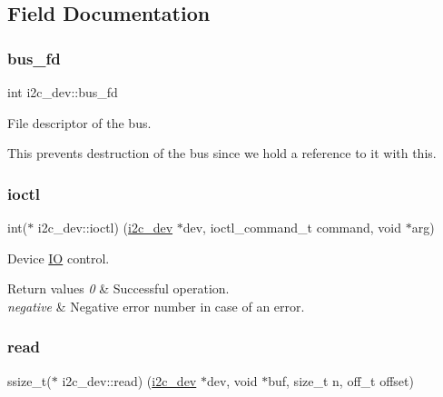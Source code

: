 \subsection{Field Documentation}
\mbox{\label{structi2c__dev_acd71af6b9e6535e147bb3eacb158ef8c}} 
\subsubsection{\texorpdfstring{bus\_fd}{bus\_fd}}
{\footnotesize\ttfamily int i2c\+\_\+dev\+::bus\+\_\+fd}



File descriptor of the bus. 

This prevents destruction of the bus since we hold a reference to it with this. \mbox{\label{structi2c__dev_a562c70ebafa483c5946f9c8ecb5011f5}} 
\subsubsection{\texorpdfstring{ioctl}{ioctl}}
{\footnotesize\ttfamily int($\ast$ i2c\+\_\+dev\+::ioctl) (\mbox{\hyperlink{structi2c__dev}{i2c\+\_\+dev}} $\ast$dev, ioctl\+\_\+command\+\_\+t command, void $\ast$arg)}



Device \mbox{\hyperlink{structIO}{IO}} control. 


\begin{DoxyRetVals}{Return values}
{\em 0} & Successful operation. \\
\hline
{\em negative} & Negative error number in case of an error. \\
\hline
\end{DoxyRetVals}
\mbox{\label{structi2c__dev_a0e86bd425e419806a6a31900ab7d1446}} 
\subsubsection{\texorpdfstring{read}{read}}
{\footnotesize\ttfamily ssize\+\_\+t($\ast$ i2c\+\_\+dev\+::read) (\mbox{\hyperlink{structi2c__dev}{i2c\+\_\+dev}} $\ast$dev, void $\ast$buf, size\+\_\+t n, off\+\_\+t offset)}



